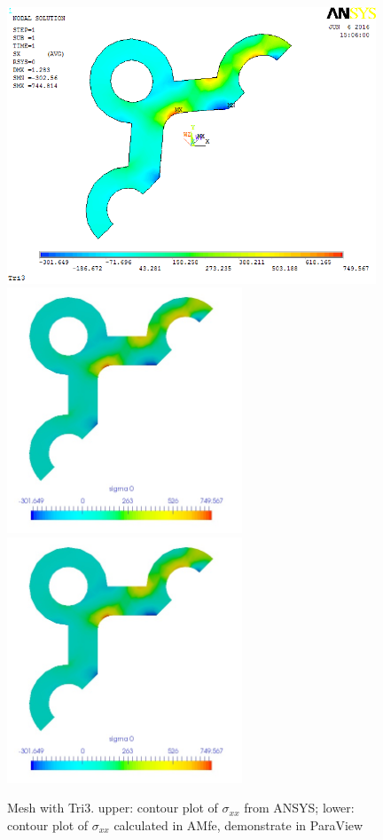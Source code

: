 \begin{figure}[htbp]
	\begin{center}
		\includegraphics[width=11cm,clip]{TTri3_Sxx.png} 	
		\includegraphics[width=7cm,clip]{TTri3_Sxx_PD.png} 		
		\includegraphics[width=7cm,clip]{TTri3_Sxx_P.png} 		
		\caption{Mesh with Tri3. upper: contour plot of $\sigma_{xx}$ from ANSYS; lower: contour plot of $\sigma_{xx}$ calculated in AMfe, demonstrate in ParaView} \label{fig: Tri3_Sxx}
	\end{center}
\end{figure}
\clearpage 

